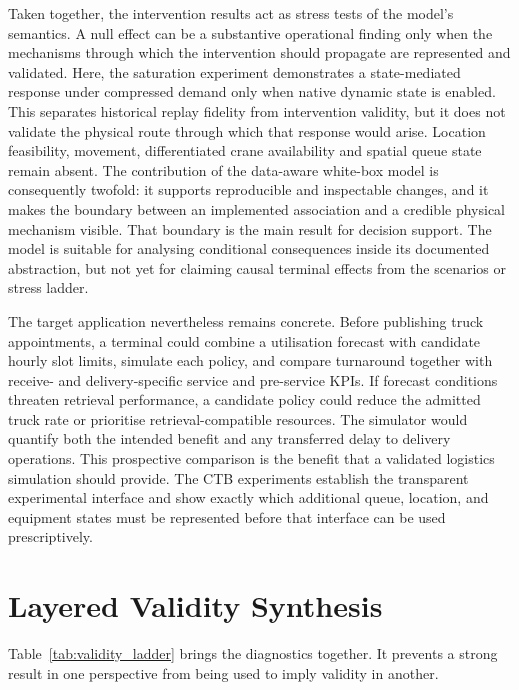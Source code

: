 Taken together, the intervention results act as stress tests of the model's
semantics. A null effect can be a substantive operational finding only when
the mechanisms through which the intervention should propagate are represented
and validated. Here, the saturation experiment demonstrates a state-mediated
response under compressed demand only when native dynamic state is enabled.
This separates historical replay fidelity from intervention validity, but it
does not validate the physical route through which that response would arise.
Location feasibility,
movement, differentiated crane availability and spatial queue state remain
absent. The contribution of the
data-aware white-box model is consequently twofold: it supports reproducible
and inspectable changes, and it makes the boundary between an implemented
association and a credible physical mechanism visible. That boundary is the
main result for decision support. The model is suitable for analysing
conditional consequences inside its documented abstraction, but not yet for
claiming causal terminal effects from the scenarios or stress ladder.

The target application nevertheless remains concrete. Before publishing truck
appointments, a terminal could combine a utilisation forecast with candidate
hourly slot limits, simulate each policy, and compare turnaround together with
receive- and delivery-specific service and pre-service KPIs. If forecast
conditions threaten retrieval performance, a candidate policy could reduce
the admitted truck rate or prioritise retrieval-compatible resources. The
simulator would quantify both the intended benefit and any transferred delay
to delivery operations. This prospective comparison is the benefit that a
validated logistics simulation should provide. The CTB experiments establish
the transparent experimental interface and show exactly which additional
queue, location, and equipment states must be represented before that interface
can be used prescriptively.

\section{Layered Validity Synthesis}
\label{sec:results_layered_validity}

Table~\ref{tab:validity_ladder} brings the diagnostics together. It prevents a
strong result in one perspective from being used to imply validity in another.

